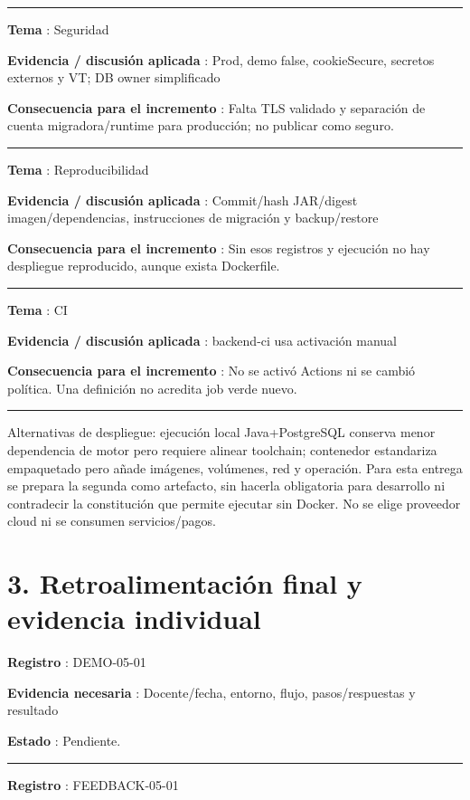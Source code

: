 \documentclass[12pt,a4paper]{report}
\begin{document}
\medskip\hrule\medskip

\textbf{Tema }: Seguridad

\textbf{Evidencia / discusión aplicada }: Prod, demo false,
cookieSecure, secretos externos y VT; DB owner simplificado

\textbf{Consecuencia para el incremento }: Falta TLS validado y
separación de cuenta migradora/runtime para producción; no publicar como
seguro.

\medskip\hrule\medskip

\textbf{Tema }: Reproducibilidad

\textbf{Evidencia / discusión aplicada }: Commit/hash JAR/digest
imagen/dependencias, instrucciones de migración y backup/restore

\textbf{Consecuencia para el incremento }: Sin esos registros y
ejecución no hay despliegue reproducido, aunque exista Dockerfile.

\medskip\hrule\medskip

\textbf{Tema }: CI

\textbf{Evidencia / discusión aplicada }: backend-ci usa activación
manual

\textbf{Consecuencia para el incremento }: No se activó Actions ni se
cambió política. Una definición no acredita job verde nuevo.

\medskip\hrule\medskip

Alternativas de despliegue: ejecución local Java+PostgreSQL conserva
menor dependencia de motor pero requiere alinear toolchain; contenedor
estandariza empaquetado pero añade imágenes, volúmenes, red y operación.
Para esta entrega se prepara la segunda como artefacto, sin hacerla
obligatoria para desarrollo ni contradecir la constitución que permite
ejecutar sin Docker. No se elige proveedor cloud ni se consumen
servicios/pagos.

\chapter{3. Retroalimentación final y evidencia
individual}\label{ACD5-semana-5-3-retroalimentaciuxf3n-final-y-evidencia-individual}

\textbf{Registro }: DEMO-05-01

\textbf{Evidencia necesaria }: Docente/fecha, entorno, flujo,
pasos/respuestas y resultado

\textbf{Estado }: Pendiente.

\medskip\hrule\medskip

\textbf{Registro }: FEEDBACK-05-01
\end{document}
